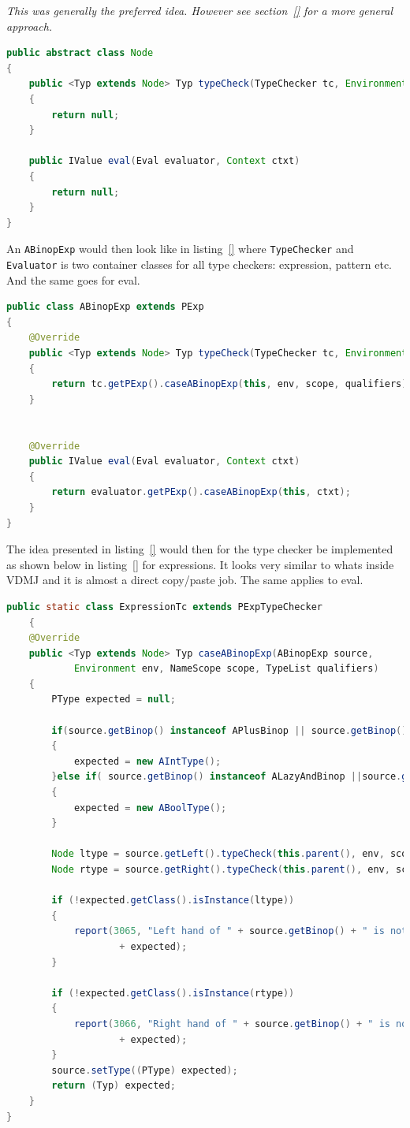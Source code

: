 \documentclass{overturerep}
\begin{document}
\textit{This was generally the preferred idea. However see section~\ref{} for a more general approach.}

\begin{lstlisting}[language=java]
public abstract class Node
{
	public <Typ extends Node> Typ typeCheck(TypeChecker tc, Environment env, NameScope scope, TypeList qualifiers)
	{
		return null;
	}

	public IValue eval(Eval evaluator, Context ctxt)
	{
		return null;
	}
}
\end{lstlisting}

An \texttt{ABinopExp} would then look like in listing~\ref{} where \texttt{TypeChecker} and \texttt{Evaluator} is two container classes for all type checkers: expression, pattern etc. And the same goes for eval.
\begin{lstlisting}[language=java]
public class ABinopExp extends PExp
{
	@Override
	public <Typ extends Node> Typ typeCheck(TypeChecker tc, Environment env, NameScope scope, TypeList  qualifiers)
	{
		return tc.getPExp().caseABinopExp(this, env, scope, qualifiers);
	}


	@Override
	public IValue eval(Eval evaluator, Context ctxt)
	{
		return evaluator.getPExp().caseABinopExp(this, ctxt);
	}
}
\end{lstlisting}

The idea presented in listing~\ref{} would then for the type checker be implemented as shown below in listing~\ref{} for expressions. It looks very similar to whats inside VDMJ and it is almost a direct copy/paste job. The same applies to eval.

\begin{lstlisting}[language=java]
public static class ExpressionTc extends PExpTypeChecker
	{
	@Override
	public <Typ extends Node> Typ caseABinopExp(ABinopExp source,
			Environment env, NameScope scope, TypeList qualifiers)
	{
		PType expected = null;
		
		if(source.getBinop() instanceof APlusBinop || source.getBinop() instanceof AMinusBinop)
		{
			expected = new AIntType();
		}else if( source.getBinop() instanceof ALazyAndBinop ||source.getBinop() instanceof ALazyOrBinop)
		{
			expected = new ABoolType();
		}
		
		Node ltype = source.getLeft().typeCheck(this.parent(), env, scope, null);
		Node rtype = source.getRight().typeCheck(this.parent(), env, scope, null);

		if (!expected.getClass().isInstance(ltype))
		{
			report(3065, "Left hand of " + source.getBinop() + " is not "
					+ expected);
		}

		if (!expected.getClass().isInstance(rtype))
		{
			report(3066, "Right hand of " + source.getBinop() + " is not "
					+ expected);
		}
		source.setType((PType) expected);
		return (Typ) expected;
	}
}
\end{lstlisting}
\end{document}
